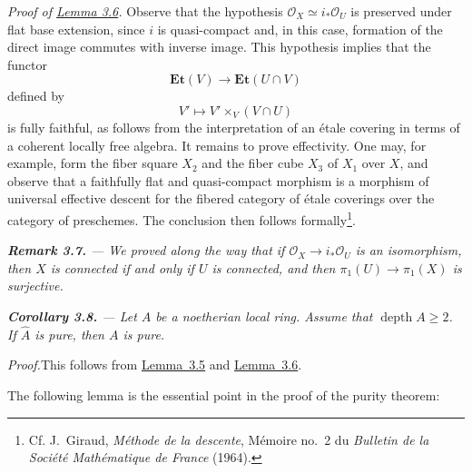 \documentclass[11pt,a4paper,oneside]{book}
\providecommand{\Oo}{\mathcal O}
\providecommand{\Et}{\mathbf{Et}}
\providecommand{\depthop}{\operatorname{depth}}
\theoremstyle{plain}
\theoremstyle{definition}
\theoremstyle{remark}
\begin{document}
\medskip
\noindent\textit{Proof of \hyperref[X.3.6]{Lemma 3.6}.}\quad
Observe that the hypothesis
$\Oo_X\simeq i_*\Oo_U$ is preserved under flat base extension, since $i$ is
quasi-compact and, in this case, formation of the direct image commutes with
inverse image. This hypothesis implies that the functor
\[
  \Et(V)\longrightarrow\Et(U\cap V)
\]
defined by
\[
  V'\longmapsto V'\times_V(V\cap U)
\]
is fully faithful, as follows from the interpretation of an étale covering
in terms of a coherent locally free algebra. It remains to prove effectivity.
One may, for example, form the fiber square $X_2$ and the fiber cube $X_3$ of
$X_1$ over $X$, and observe that a faithfully flat and quasi-compact
morphism is a morphism of universal effective descent for the fibered
category of étale coverings over the category of preschemes. The conclusion
then follows formally\renewcommand{\thefootnote}{(*)}\footnote{Cf. J.~Giraud,
\emph{Méthode de la descente}, Mémoire no.~2 du \emph{Bulletin de la Société
Mathématique de France} (1964).}.

\medskip
{\itshape
{}\noindent\textbf{Remark 3.7.} --- We proved along the way that if
$\mathcal O_X\to i_*\mathcal O_U$ is an isomorphism, then $X$ is connected if
and only if $U$ is connected, and then $\pi_1(U)\to\pi_1(X)$ is surjective.
}

\medskip
{\itshape
{}\noindent\textbf{Corollary 3.8.} --- Let $A$ be a noetherian local ring.
Assume that $\depthop A\geq 2$. If $\widehat{A}$ is pure, then $A$ is pure.
}

\medskip
\noindent\emph{Proof.}\quad This follows from \hyperref[X.3.5]{Lemma~3.5} and \hyperref[X.3.6]{Lemma~3.6}.

\medskip
\noindent The following lemma is the essential point in the proof of the purity theorem:
\end{document}
